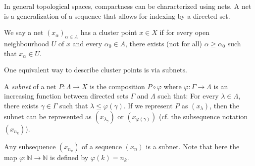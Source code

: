 

In general topological spaces, compactness can be characterized using nets. A net is a generalization of a sequence that allows for indexing by a directed set.

\begin{definition}
    We say a net \((x_\alpha)_{\alpha \in A}\) has a cluster point \(x \in X\) if for every open neighbourhood \(U\) of \(x\) and every \(\alpha_0 \in A\), there exists (not for all) \(\alpha \geq \alpha_0\) such that \(x_\alpha \in U\).
\end{definition}

One equivalent way to describe cluster points is via subnets.

\begin{definition}
    A \emph{subnet} of a net $P:\Lambda\to X$ is the composition $P\circ \varphi$ where \(\varphi: \Gamma \to \Lambda\) is an increasing function between directed sets \(\Gamma\) and \(\Lambda\) such that: For every \(\lambda \in \Lambda\), there exists \(\gamma\in \Gamma\) such that $\lambda\leq\varphi(\gamma)$. If we represent $P$ as $(x_\lambda)$, then the subnet can be represented as $(x_{\lambda_\gamma})$ or $(x_{\varphi(\gamma)})$ (cf. the subsequence notation $(x_{n_k})$).
\end{definition}
\begin{example}
    Any subsequence $(x_{n_k})$ of a sequence $(x_n)$ is a subnet. Note that here the map \(\varphi: \mathbb{N} \to \mathbb{N}\) is defined by \(\varphi(k) = n_k\).
\end{example}


